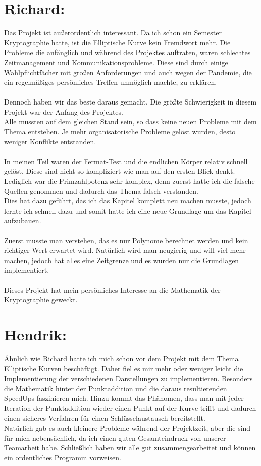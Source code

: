 \section*{Richard:}
Das Projekt ist außerordentlich interessant. Da ich schon ein Semester Kryptographie hatte, 
ist die Elliptische Kurve kein Fremdwort mehr. Die Probleme die anfänglich und während des Projektes auftraten, waren schlechtes Zeitmanagement und Kommunikationsprobleme.
Diese sind durch einige Wahlpflichtfächer mit großen Anforderungen und auch wegen der Pandemie, die ein regelmäßiges persönliches Treffen unmöglich machte, zu erklären.\\
\\
Dennoch haben wir das beste daraus gemacht. Die größte Schwierigkeit in diesem Projekt war der Anfang des Projektes.
\\
Alle mussten auf dem gleichen Stand sein, so dass keine neuen Probleme mit dem Thema entstehen.
Je mehr organisatorische Probleme gelöst wurden, desto weniger Konflikte entstanden.
\\
\\
In meinen Teil waren der Fermat-Test und die endlichen Körper relativ schnell gelöst.
Diese sind nicht so kompliziert wie man auf den ersten Blick denkt.\\
Lediglich war die Primzahlpotenz sehr komplex, denn zuerst hatte ich die falsche Quellen genommen und dadurch das Thema falsch verstanden.\\
Dies hat dazu geführt, das ich das Kapitel komplett neu machen musste, jedoch lernte ich schnell dazu und somit hatte ich eine neue Grundlage um das Kapitel aufzubauen.\\
\\
Zuerst musste man verstehen, das es nur Polynome berechnet werden und kein richtiger Wert erwartet wird. 
Natürlich wird man neugierig und will viel mehr machen, jedoch hat alles eine Zeitgrenze und es wurden nur die Grundlagen implementiert.\\
\\
Dieses Projekt hat mein persönliches Interesse an die Mathematik der Kryptographie geweckt. 

\section*{Hendrik:}
Ähnlich wie Richard hatte ich mich schon vor dem Projekt mit dem Thema Elliptische Kurven beschäftigt. Daher fiel es mir mehr oder weniger leicht die Implementierung der verschiedenen Darstellungen zu implementieren. Besonders die Mathematik hinter der Punktaddition und die daraus resultierenden SpeedUps faszinieren mich. Hinzu kommt das Phänomen, dass man mit jeder Iteration der Punktaddition wieder einen Punkt auf der Kurve trifft und dadurch einen sicheres Verfahren für einen Schlüsselaustausch bereitstellt.\\
Natürlich gab es auch kleinere Probleme während der Projektzeit, aber die sind für mich nebensächlich, da ich einen guten Gesamteindruck von unserer Teamarbeit habe. Schließlich haben wir alle gut zusammengearbeitet und können ein ordentliches Programm vorweisen.


